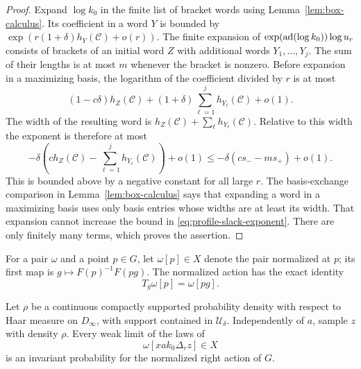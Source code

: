 \begin{proof}
Expand $\log k_0$ in the finite list of bracket words using
Lemma~\ref{lem:box-calculus}.  Its coefficient in a word $Y$ is bounded
by $\exp(r(1+\delta)h_Y(\mathcal C)+o(r))$.  The finite expansion of
$\exp(\operatorname{ad}(\log k_0))\log u_r$ consists of brackets of an initial word
$Z$ with additional words $Y_1,\ldots,Y_j$.  The sum of their lengths
is at most $m$ whenever the bracket is nonzero.  Before expansion in a
maximizing basis, the logarithm of the coefficient divided by $r$ is
at most
\[
 (1-c\delta)h_Z(\mathcal C)
       +(1+\delta)\sum_{\ell=1}^j h_{Y_\ell}(\mathcal C)+o(1).
\]
The width of the resulting word is
$h_Z(\mathcal C)+\sum_\ell h_{Y_\ell}(\mathcal C)$.  Relative to this
width the exponent is therefore at most
\begin{equation}\label{eq:profile-slack-exponent}
 -\delta\left(c h_Z(\mathcal C)
                  -\sum_{\ell=1}^j h_{Y_\ell}(\mathcal C)\right)+o(1)
 \le -\delta(cs_--ms_+)+o(1).
\end{equation}
This is bounded above by a negative constant for all large $r$.
The basis-exchange comparison in Lemma~\ref{lem:box-calculus} says
that expanding a word in a maximizing basis uses only basis entries
whose widths are at least its width.  That expansion cannot increase
the bound in \eqref{eq:profile-slack-exponent}.  There are only finitely
many terms, which proves the assertion.
\end{proof}

For a pair $\omega$ and a point $p\in G$, let $\omega[p]\in X$ denote
the pair normalized at $p$; its first map is
$g\mapsto F(p)^{-1}F(pg)$.  The normalized action has the exact
identity
\begin{equation}\label{eq:profile-normalization-action}
 T_g\omega[p]=\omega[pg].
\end{equation}

\begin{lemma}\label{lem:occupation-invariance}
Let $\rho$ be a continuous compactly supported probability density
with respect to Haar measure on $D_\infty$, with support contained in
$\mathcal U_\delta$.  Independently of $a$, sample $z$ with density
$\rho$.  Every weak limit of the laws of
\[
 \omega[xak_0\Delta_r z]\in X
\]
is an invariant probability for the normalized right action of $G$.
\end{lemma}

